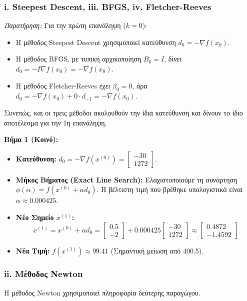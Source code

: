 \documentclass[a4paper,12pt]{article}
\begin{document}
\subsubsection*{i. Steepest Descent, iii. BFGS, iv. Fletcher-Reeves}
\textit{Παρατήρηση:} Για την πρώτη επανάληψη ($k=0$):
\begin{itemize}
    \item Η μέθοδος Steepest Descent χρησιμοποιεί κατεύθυνση $d_0 = -\nabla f(x_0)$.
    \item Η μέθοδος BFGS, με τυπική αρχικοποίηση $B_0 = I$, δίνει $d_0 = -I \nabla f(x_0) = -\nabla f(x_0)$.
    \item Η μέθοδος Fletcher-Reeves έχει $\beta_0 = 0$, άρα $d_0 = -\nabla f(x_0) + 0 \cdot d_{-1} = -\nabla f(x_0)$.
\end{itemize}
Συνεπώς, και οι τρεις μέθοδοι ακολουθούν την ίδια κατεύθυνση και δίνουν το ίδιο αποτέλεσμα για την 1η επανάληψη.

\textbf{Βήμα 1 (Κοινό):}
\begin{itemize}
    \item \textbf{Κατεύθυνση:} $d_0 = -\nabla f(x^{(0)}) = \begin{bmatrix} -30 \\ 1272 \end{bmatrix}$.
    \item \textbf{Μήκος Βήματος (Exact Line Search):}
    Ελαχιστοποιούμε τη συνάρτηση $\phi(\alpha) = f(x^{(0)} + \alpha d_0)$.
    Η βέλτιστη τιμή που βρέθηκε υπολογιστικά είναι $\alpha \approx 0.000425$.
    \item \textbf{Νέο Σημείο $x^{(1)}$:}
    $$ x^{(1)} = x^{(0)} + \alpha d_0 = \begin{bmatrix} 0.5 \\ -2 \end{bmatrix} + 0.000425 \begin{bmatrix} -30 \\ 1272 \end{bmatrix} \approx \begin{bmatrix} 0.4872 \\ -1.4592 \end{bmatrix} $$
    \item \textbf{Νέα Τιμή:} $f(x^{(1)}) \approx 99.41$ (Σημαντική μείωση από 400.5).
\end{itemize}

\subsubsection*{ii. Μέθοδος Newton}
Η μέθοδος Newton χρησιμοποιεί πληροφορία δεύτερης παραγώγου.
\end{document}
